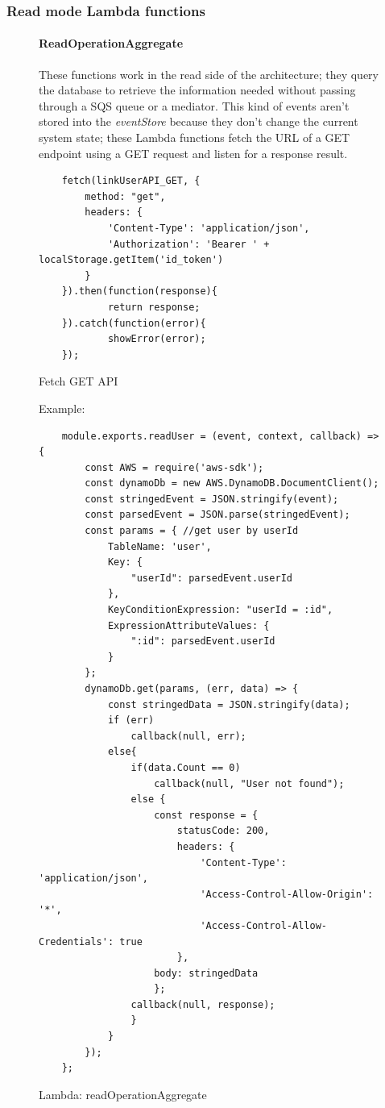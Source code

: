 \subsubsection{Read mode Lambda functions}
\begin{figure} [H]
\paragraph{ReadOperationAggregate} \Spazio
These functions work in the read side of the architecture; they query the database to retrieve the information needed without passing through a SQS queue or a mediator. This kind of events aren't stored into the \emph{eventStore} because they don't change the current system state; these Lambda functions fetch the URL of a GET endpoint using a GET request and listen for a response result.
\begin{lstlisting}
	fetch(linkUserAPI_GET, {
		method: "get",
		headers: {
			'Content-Type': 'application/json',
			'Authorization': 'Bearer ' + localStorage.getItem('id_token')
		}
	}).then(function(response){
			return response;
	}).catch(function(error){
			showError(error);
	});
\end{lstlisting}
	\caption{Fetch GET API}\label{}
\end{figure}

\begin{figure} [H]
Example:
\begin{lstlisting}
	module.exports.readUser = (event, context, callback) => {
		const AWS = require('aws-sdk');
		const dynamoDb = new AWS.DynamoDB.DocumentClient();
		const stringedEvent = JSON.stringify(event);
		const parsedEvent = JSON.parse(stringedEvent);
		const params = { //get user by userId
			TableName: 'user',
			Key: {
				"userId": parsedEvent.userId
			},
			KeyConditionExpression: "userId = :id",
			ExpressionAttributeValues: {
				":id": parsedEvent.userId
			}
		};
		dynamoDb.get(params, (err, data) => {
			const stringedData = JSON.stringify(data);
			if (err)
				callback(null, err);
			else{
				if(data.Count == 0)
					callback(null, "User not found");
				else {
					const response = {
						statusCode: 200,
						headers: {
							'Content-Type': 'application/json',
							'Access-Control-Allow-Origin': '*',
							'Access-Control-Allow-Credentials': true
						},
					body: stringedData
					};
				callback(null, response);
				}      
			}
		});
	};
\end{lstlisting}
	\caption{Lambda: readOperationAggregate}
\end{figure}

